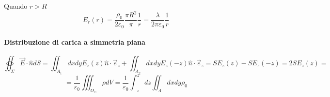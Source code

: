 Quando $r > R$ 
$$
E_r(r) = \frac{\rho_0}{2\varepsilon_0} \frac{\pi R^2}{\pi} \frac{1}{r} = 
\frac{\lambda}{2\pi\varepsilon_0} \frac{1}{r}
$$

\paragraph{Distribuzione di carica a simmetria piana}

$$
\oiint_\Sigma \vec{E}\cdot\hat{n}dS = \iint_{A_1} dxdy E_z(z)\hat{n}\cdot\vec{e}_z + 
\iint_{A_2} dxdy E_z(-z)\hat{n}\cdot\vec{e}_z = SE_z(z) -SE_z(-z) = 2 S E_z(z) =
$$
$$
=\frac{1}{\varepsilon_0} \iiint_{\Omega_\Sigma} \rho dV = \frac{1}{\varepsilon_0} \int_{-z}^{z}dz \iint_A dxdy\rho_0
$$




